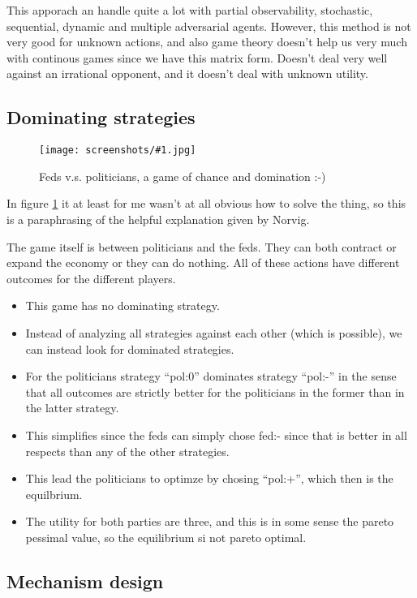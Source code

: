 \documentclass[a4, 12pt, english, USenglish]{scrreprt}
\newcommand{\screenshot}[2]{
\begin{figure}[htb]
\texttt{[image: screenshots/\#1.jpg]}
\label{#1}
\caption{#2}
\end{figure}}
\begin{document}
This apporach an handle quite a lot with partial observability,
stochastic, sequential, dynamic and multiple adversarial agents.
However, this method is not very good for unknown actions, and also
game theory doesn't help us very much with continous games since we
have this matrix form.  Doesn't deal very well against an irrational
opponent, and it doesn't deal with unknown utility.




\subsection{Dominating strategies}

\screenshot{fedvspoliticians}{Feds v.s. politicians, a game of chance
  and domination :-)}

In figure \ref{fedvspoliticians} it at least for me wasn't at all
obvious how to solve the thing, so this is a paraphrasing of the
helpful explanation given by Norvig.   

The game itself is between politicians and the feds.  They can both
contract or expand the economy or they can do nothing.   All of these
actions have different outcomes for the different players.


\begin{itemize}
\item This game has no dominating strategy.
\item Instead of  analyzing all strategies against each other (which
  is possible), we can instead look for dominated strategies.
\item For the politicians strategy ``pol:0'' dominates strategy ``pol:-'' in
  the sense that all outcomes are strictly better for the politicians
  in the former than in the latter strategy.
\item This simplifies since the feds can simply chose fed:- since that
  is better in all respects than any of the other strategies.
\item This lead the politicians to optimze by chosing ``pol:+'', which
  then is the equilbrium.
\item The utility for both parties are three, and this is in some
  sense the pareto pessimal value, so the equilibrium si not pareto optimal.
\end{itemize}



\subsection{Mechanism design}
\end{document}
